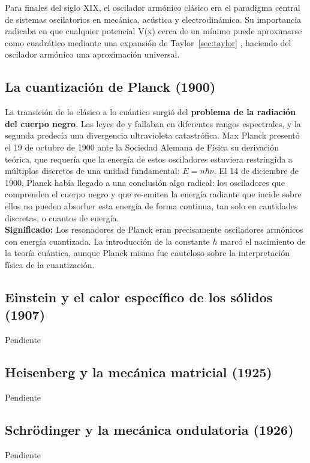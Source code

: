 \documentclass[11pt,a4paper,spanish]{book}
\begin{document}
Para finales del siglo XIX, el oscilador armónico clásico era el paradigma central de sistemas oscilatorios en mecánica, acústica y electrodinámica. Su importancia radicaba en que cualquier potencial V(x) cerca de un mínimo puede aproximarse como cuadrático mediante una expansión de Taylor~\ref{sec:taylor} , haciendo del oscilador armónico una aproximación universal.

\subsection*{La cuantización de Planck (1900)}
La transición de lo clásico a lo cuántico surgió del \textbf{problema de la radiación del cuerpo negro}. Las leyes de \cite{wien1896} y \cite{rayleigh1900, jeans1905} fallaban en diferentes rangos espectrales, y la segunda predecía una divergencia ultravioleta catastrófica. Max Planck presentó  el 19 de octubre de 1900 ante la Sociedad Alemana de Física \citep{planck1901} su derivación teórica, que requería que la energía de estos osciladores estuviera restringida a múltiplos discretos de una unidad fundamental: $E = n\hbar\nu$. El 14 de diciembre de 1900, Planck había llegado a una conclusión algo radical: los osciladores que comprenden el cuerpo negro y que re-emiten la energía radiante que incide sobre ellos no pueden absorber esta energía de forma continua, tan solo en cantidades discretas, o cuantos de energía.\\

\textbf{Significado:} Los resonadores de Planck eran precisamente osciladores armónicos con energía cuantizada. La introducción de la constante $h$ marcó el nacimiento de la teoría cuántica, aunque Planck mismo fue cauteloso sobre la interpretación física de la cuantización.



\subsection*{Einstein y el calor específico de los sólidos (1907)}
Pendiente

\subsection*{Heisenberg y la mecánica matricial (1925)}
Pendiente


\subsection*{Schrödinger y la mecánica ondulatoria (1926)}
Pendiente
\end{document}
